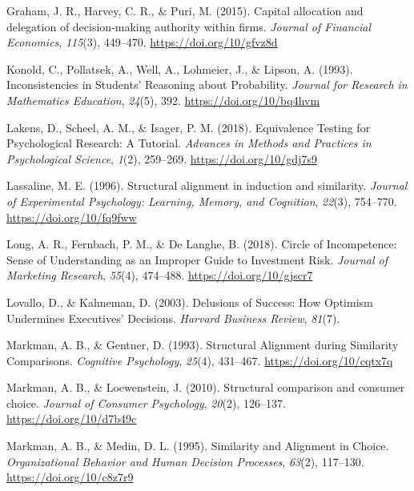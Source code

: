 \documentclass[
  english,
  man, donotrepeattitle,floatsintext]{apa7}
\newlength{\cslhangindent}
\newenvironment{cslreferences}%
  {\setlength{\parindent}{0pt}%
  \everypar{\setlength{\hangindent}{\cslhangindent}}\ignorespaces}%
  {\par}
\theoremstyle{definition}
\theoremstyle{definition}
\theoremstyle{definition}
\theoremstyle{definition}
\theoremstyle{remark}
\begin{document}
\begin{cslreferences}
\leavevmode\hypertarget{ref-graham2015}{}%
Graham, J. R., Harvey, C. R., \& Puri, M. (2015). Capital allocation and delegation of decision-making authority within firms. \emph{Journal of Financial Economics}, \emph{115}(3), 449--470. \url{https://doi.org/10/gfvz8d}

\leavevmode\hypertarget{ref-konold1993}{}%
Konold, C., Pollatsek, A., Well, A., Lohmeier, J., \& Lipson, A. (1993). Inconsistencies in Students' Reasoning about Probability. \emph{Journal for Research in Mathematics Education}, \emph{24}(5), 392. \url{https://doi.org/10/bq4hvm}

\leavevmode\hypertarget{ref-lakens2018}{}%
Lakens, D., Scheel, A. M., \& Isager, P. M. (2018). Equivalence Testing for Psychological Research: A Tutorial. \emph{Advances in Methods and Practices in Psychological Science}, \emph{1}(2), 259--269. \url{https://doi.org/10/gdj7s9}

\leavevmode\hypertarget{ref-lassaline1996}{}%
Lassaline, M. E. (1996). Structural alignment in induction and similarity. \emph{Journal of Experimental Psychology: Learning, Memory, and Cognition}, \emph{22}(3), 754--770. \url{https://doi.org/10/fq9fww}

\leavevmode\hypertarget{ref-long2018}{}%
Long, A. R., Fernbach, P. M., \& De Langhe, B. (2018). Circle of Incompetence: Sense of Understanding as an Improper Guide to Investment Risk. \emph{Journal of Marketing Research}, \emph{55}(4), 474--488. \url{https://doi.org/10/gjscr7}

\leavevmode\hypertarget{ref-lovallo2003}{}%
Lovallo, D., \& Kahneman, D. (2003). Delusions of Success: How Optimism Undermines Executives' Decisions. \emph{Harvard Business Review}, \emph{81}(7).

\leavevmode\hypertarget{ref-markman1993}{}%
Markman, A. B., \& Gentner, D. (1993). Structural Alignment during Similarity Comparisons. \emph{Cognitive Psychology}, \emph{25}(4), 431--467. \url{https://doi.org/10/cqtx7q}

\leavevmode\hypertarget{ref-markman2010}{}%
Markman, A. B., \& Loewenstein, J. (2010). Structural comparison and consumer choice. \emph{Journal of Consumer Psychology}, \emph{20}(2), 126--137. \url{https://doi.org/10/d7b49c}

\leavevmode\hypertarget{ref-markman1995}{}%
Markman, A. B., \& Medin, D. L. (1995). Similarity and Alignment in Choice. \emph{Organizational Behavior and Human Decision Processes}, \emph{63}(2), 117--130. \url{https://doi.org/10/c8z7r9}


\end{cslreferences}
\end{document}
